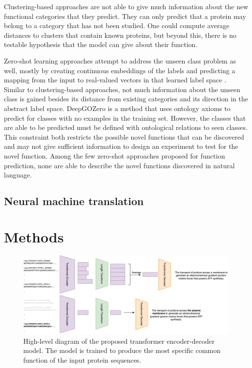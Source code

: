 \documentclass{article}
\begin{document}
Clustering-based approaches are not able to give much information about the new functional categories that they predict.
They can only predict that a protein may belong to a category that has not been studied.
One could compute average distances to clusters that contain known proteins, but beyond this, there is no testable hypothesis that the model can give about their function.

Zero-shot learning approaches attempt to address the unseen class problem as well, mostly by creating continuous embeddings of the labels and predicting a mapping from the input to real-valued vectors in that learned label space \cite{CLIP}.
Similar to clustering-based approaches, not much information about the unseen class is gained besides its distance from existing categories and its direction in the abstract label space.
DeepGOZero \cite{DeepGOZero} is a method that uses ontology axioms to predict for classes with no examples in the training set.
However, the classes that are able to be predicted must be defined with ontological relations to seen classes.
This constraint both restricts the possible novel functions that can be discovered and may not give sufficient information to design an experiment to test for the novel function.
Among the few zero-shot approaches proposed for function prediction, none are able to describe the novel functions discovered in natural language.

\subsection{Neural machine translation}

\section{Methods}
\begin{figure}
    \centering
    \includegraphics[width=0.9\linewidth]{prot2go.png}
    \caption{High-level diagram of the proposed transformer encoder-decoder model.
The model is trained to produce the most specific common function of the input protein sequences.}
    \label{overview}
\end{figure}
\end{document}
